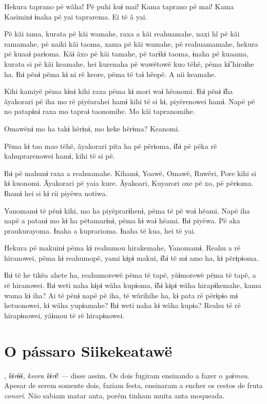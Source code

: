 Hekura taprano pë wãha! Pë puhi kuɨ mai! Kama taprano pë mai! Kama
Kasiminɨ ɨnaha pë yai taprarema. Ei të ã yai. 

Pë kãi iama, kurata pë kãi wamahe, raxa a kãi reahuamahe, naxi hĩ pë kãi
ramamahe, pë naiki kãi taoma, xama pë kãi wamahe, pë reahuamamahe,
hekura pë kuaaɨ parɨoma. Kãɨ ãxo pë kãi tamahe, pë tarɨkɨ taoma, ɨnaha
pë kuaama, kurata si pë kãi keamahe, hei kurenaha pë wawëtowë kuo tëhë,
pëma kɨ̃ hiraɨhe ha. Ɨhɨ pënɨ pëma kɨ ni rë keore, pëma të taɨ hëopë. A nii keamahe. 

Kihi kamiyë pëma kɨnɨ kihi raxa pëma kɨ mori waɨ hëonomi. Ɨhɨ pënɨ ɨ̃ha
ãyakorari pë iha mo rë piyëarahei hamɨ kihi të si kɨ, piyërenowei hamɨ.
Napë pë no patapɨnɨ raxa mo tapraɨ taonomihe. Mo kãi tapranomihe. 

Omawënɨ mo ha takɨ hërɨnɨ, mo keke hërɨma? Keanomi. 

Pëma kɨ tao mao tëhë, ãyakorari pita ha pë përɨoma, ɨ̃hɨ pë pëka rë
kahuprarenowei hamɨ, kihi të si pë. 

Ɨhɨ pë mahunɨ raxa a reahuamahe. Kihamɨ, Yoawë, Omawë, Ruwëri, Pore kihi
si kɨ kuonomi. Ãyakorari pë yaia kure. Ãyakoari, Kuyarori oxe pë xo, pë
përɨoma. Ɨhamɨ hei si kɨ rii piyëwa notiwa. 

Yanomamɨ të pënɨ kihi, mo ha piyëprarɨhenɨ, pëma të pë waɨ hëami. Napë
iha napë a patanɨ mo kɨ ha pëtamarɨnɨ, pëma kɨ waɨ hëami. Ɨhɨ piyëwa. Pë
aka praukurayoma. Ɨnaha a kuprarioma. Ɨnaha të kua, hei të yai. 

Hekura pë makuinɨ pëma kɨ reahumou hirakemahe, Yanomamɨ. Reahu a rë
hiranowei, pëma kɨ reahumopë, yami kɨpɨ makui, ɨ̃hɨ të mɨ amo ha, kɨ
përɨpɨoma. 

Ɨhɨ të he tikëa ahete ha, reahumorewë pëma të tapë, yãɨmorewë pëma të
tapë, a rë hiranowei. Ɨhɨ weti naha kɨpɨ wãha kupɨoma, ɨ̃hɨ kɨpɨ wãha
hirapɨkemahe, kama wama kɨ iha? Ai të pënɨ napë pë iha, të wãrihihe ha,
kɨ pata rë përɨpɨo mɨ hetuonowei, kɨ wãha yupɨamahe? Ɨhɨ weti naha kɨ
wãha kupɨa? Reahu të rë hirapɨnowei, yãɨmou të rë hirapɨnowei. 

\chapter{O pássaro Siikekeatawë}
 
, \textit{kɨrɨɨɨ, keora kɨrɨ}! --- disse assim. Os dois fugiram ensinando a fazer o \textit{yaɨmou}. Apesar de serem somente dois, faziam festa, ensinaram a encher os cestos de fruta
\textit{conori}. Não sabiam matar anta, porém tinham muita anta moqueada. 

